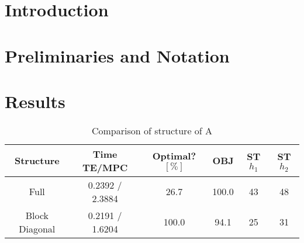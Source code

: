 \documentclass[preprint,12pt,authoryear]{elsarticle}
\begin{document}

\section{Introduction}
\label{sec:intro}

\section{Preliminaries and Notation}
\label{sec:Preliminaries}

\section{Results}
\label{sec:Results}

\begin{table}[h]
  \centering
  \caption{Comparison of structure of A}
  \label{tab:ident-comp}
  \begin{tabular}{cccccc}
      \toprule
        Structure & Time TE/MPC & Optimal? \([\%]\) & OBJ & ST \(h_1\) & ST \(h_2\) \\
        \midrule
        Full          & 0.2392 / 2.3884 & 26.7 & 100.0 & 43 & 48 \\
        Block Diagonal & 0.2191 / 1.6204 & 100.0 & 94.1 & 25 & 31 \\
        \bottomrule
  \end{tabular}
\end{table}
\end{document}
